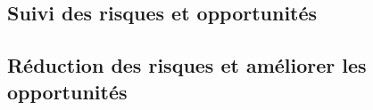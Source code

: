 \subsection{Suivi des risques et opportunités}

\subsection{Réduction des risques et améliorer les opportunités}





%
%
